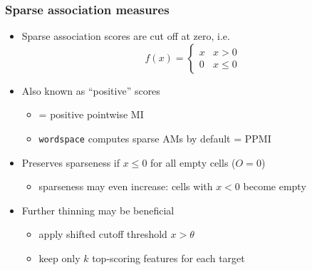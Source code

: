 \documentclass[t]{beamer} %
\begin{document}
\begin{frame}
  \frametitle{Sparse association measures}

  \begin{itemize}
  \item Sparse association scores are cut off at zero, i.e.\
    \[
    f(x) =
    \begin{cases}
      x & x > 0 \\
      0 & x \leq 0
    \end{cases}
    \]
  \item Also known as ``positive'' scores
    \begin{itemize}
    \item {} = positive pointwise MI \citep[e.g.][]{Bullinaria:Levy:07}
    \item \texttt{wordspace} computes sparse AMs by default \so \code{"MI"} = PPMI
    \end{itemize}
  \item<2-> Preserves sparseness if $x \leq 0$ for all empty cells ($O = 0$)
    \begin{itemize}
    \item sparseness may even increase: cells with $x < 0$ become empty
    \end{itemize}
    \gap
  \item<3-> Further thinning may be beneficial \citep{Polajnar:Clark:14}
    \begin{itemize}
    \item apply shifted cutoff threshold $x > \theta$ \citep{Levy:Goldberg:Dagan:15}
    \item keep only $k$ top-scoring features for each target
    \end{itemize}
  \end{itemize}
\end{frame}
\end{document}
